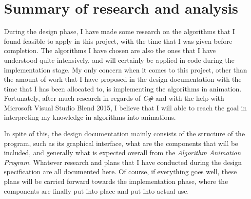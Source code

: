 \section{Summary of research and analysis}

During the design phase, I have made some research on the algorithms that I found feasible to apply in this project, with the time that I was given before completion. The algorithms I have chosen are also the ones that I have understood quite intensively, and will certainly be applied in code during the implementation stage. My only concern when it comes to this project, other than the amount of work that I have proposed in the design documentation with the time that I has been allocated to, is implementing the algorithms in animation. Fortunately, after much research in regards of \textit{C\#} and with the help with Microsoft Visual Studio Blend 2015, I believe that I will able to reach the goal in interpreting my knowledge in algorithms into animations.

In spite of this, the design documentation mainly consists of the structure of the program, such as its graphical interface, what are the components that will be included, and generally what is expected overall from the \textit{Algorithm Animation Program}. Whatever research and plans that I have conducted during the design specification are all documented here. Of course, if everything goes well, these plans will be carried forward towards the implementation phase, where the components are finally put into place and put into actual use. 
